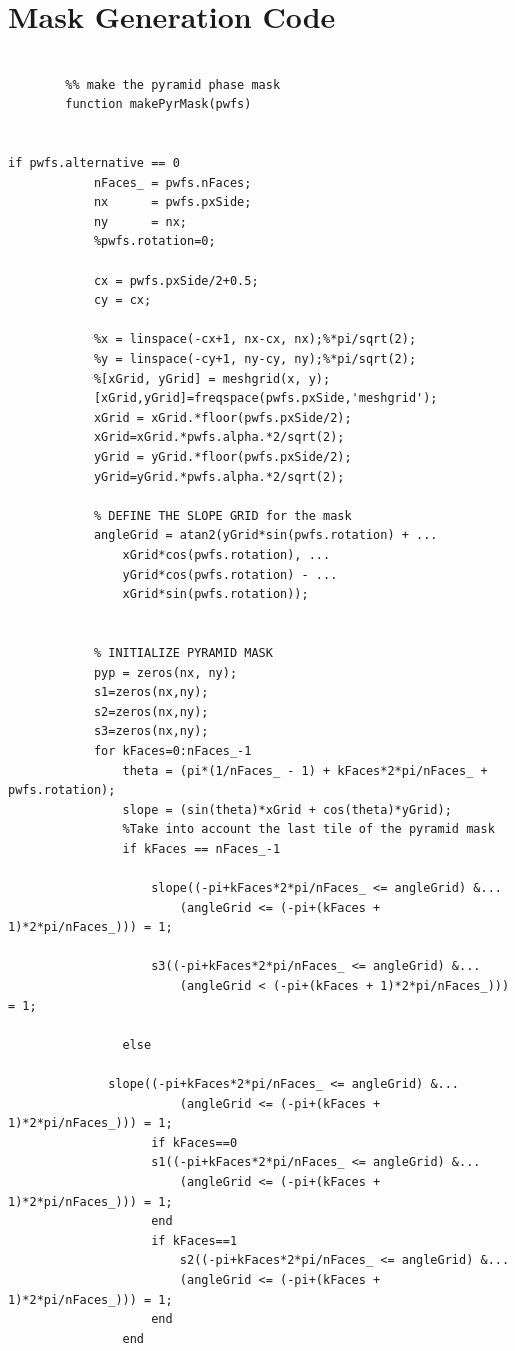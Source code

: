 \section{Mask Generation Code}\label{mask}
\lstset{language=Matlab}
\begin{lstlisting}

        %% make the pyramid phase mask
        function makePyrMask(pwfs)
            

if pwfs.alternative == 0
            nFaces_ = pwfs.nFaces;
            nx      = pwfs.pxSide;
            ny      = nx;
            %pwfs.rotation=0;
            
            cx = pwfs.pxSide/2+0.5;
            cy = cx;
            
            %x = linspace(-cx+1, nx-cx, nx);%*pi/sqrt(2);
            %y = linspace(-cy+1, ny-cy, ny);%*pi/sqrt(2);
            %[xGrid, yGrid] = meshgrid(x, y);
            [xGrid,yGrid]=freqspace(pwfs.pxSide,'meshgrid');
            xGrid = xGrid.*floor(pwfs.pxSide/2);
            xGrid=xGrid.*pwfs.alpha.*2/sqrt(2);
            yGrid = yGrid.*floor(pwfs.pxSide/2);
            yGrid=yGrid.*pwfs.alpha.*2/sqrt(2);

            % DEFINE THE SLOPE GRID for the mask
            angleGrid = atan2(yGrid*sin(pwfs.rotation) + ...
                xGrid*cos(pwfs.rotation), ...
                yGrid*cos(pwfs.rotation) - ...
                xGrid*sin(pwfs.rotation));

            
            % INITIALIZE PYRAMID MASK
            pyp = zeros(nx, ny);
            s1=zeros(nx,ny);
            s2=zeros(nx,ny);
            s3=zeros(nx,ny);
            for kFaces=0:nFaces_-1
                theta = (pi*(1/nFaces_ - 1) + kFaces*2*pi/nFaces_ + pwfs.rotation);
                slope = (sin(theta)*xGrid + cos(theta)*yGrid);
                %Take into account the last tile of the pyramid mask
                if kFaces == nFaces_-1
                 
                    slope((-pi+kFaces*2*pi/nFaces_ <= angleGrid) &...
                        (angleGrid <= (-pi+(kFaces + 1)*2*pi/nFaces_))) = 1; 
                    
                    s3((-pi+kFaces*2*pi/nFaces_ <= angleGrid) &...
                        (angleGrid < (-pi+(kFaces + 1)*2*pi/nFaces_))) = 1;
                        
                else
                   
              slope((-pi+kFaces*2*pi/nFaces_ <= angleGrid) &...
                        (angleGrid <= (-pi+(kFaces + 1)*2*pi/nFaces_))) = 1;
                    if kFaces==0
                    s1((-pi+kFaces*2*pi/nFaces_ <= angleGrid) &...
                        (angleGrid <= (-pi+(kFaces + 1)*2*pi/nFaces_))) = 1;
                    end
                    if kFaces==1
                        s2((-pi+kFaces*2*pi/nFaces_ <= angleGrid) &...
                        (angleGrid <= (-pi+(kFaces + 1)*2*pi/nFaces_))) = 1;
                    end
                end
            

\end{lstlisting}
